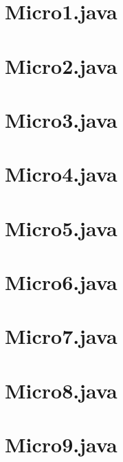 \documentclass[12pt,a4paper,twoside]{report}
\begin{document}
\section{Micro1.java}

\section{Micro2.java}

\section{Micro3.java}

\section{Micro4.java}

\section{Micro5.java}

\section{Micro6.java}

\section{Micro7.java}

\section{Micro8.java}

\section{Micro9.java}

\end{document}
